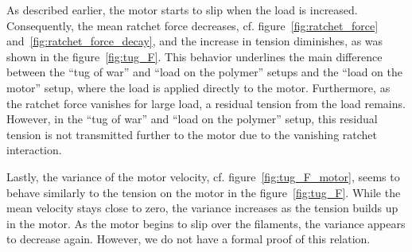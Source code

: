 \documentclass[aps,pre,twocolumn,showpacs,showkeys,superscriptaddress,floatfix]{revtex4-1}
\begin{document}
As described earlier, the motor starts to slip when the load is increased.
Consequently, the mean ratchet force decreases, cf. figure~\ref{fig:ratchet_force} and~\ref{fig:ratchet_force_decay}, and the increase in tension diminishes, 
as was shown in the figure~\ref{fig:tug_F}.
This behavior underlines the main difference between the ``tug of war'' and ``load on the polymer'' setups and the ``load on the motor'' setup, 
where the load is applied directly to the motor. 
Furthermore, as the ratchet force vanishes for large load, a residual tension from the load remains.
However, in the ``tug of war'' and ``load on the polymer'' setup, this residual tension is not transmitted further to the motor due to the vanishing ratchet interaction.

Lastly, the variance of the motor velocity, cf. figure~\ref{fig:tug_F_motor}, seems to behave similarly to the tension on the motor in the figure~\ref{fig:tug_F}. 
While the mean velocity stays close to zero, the variance increases as the tension builds up in the motor. 
As the motor begins to slip over the filaments, the variance appears to decrease again.
However, we do not have a formal proof of this relation.
\end{document}
